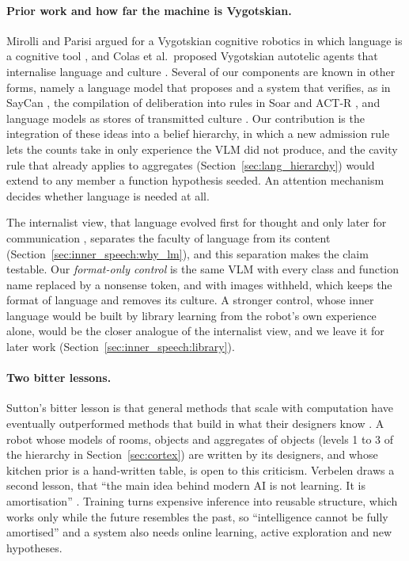 \paragraph{Prior work and how far the machine is Vygotskian.}
Mirolli and Parisi argued for a Vygotskian cognitive robotics in which language is a cognitive tool
\cite{mirolli2011towards}, and Colas et al.\ proposed Vygotskian autotelic agents that internalise language and culture
\cite{colas2022language}. Several of our components are known in other forms, namely a language model that proposes
and a system that verifies, as in SayCan \cite{ahn2022saycan}, the compilation of deliberation into rules in Soar and
ACT-R \cite{laird1986chunking, anderson1982acquisition, taatgen2002production}, and language models as stores of transmitted culture
\cite{yiu2024transmission}. Our contribution is the
integration of these ideas into a belief hierarchy, in which a new admission rule lets the counts take in only
experience the VLM did not produce, and the cavity rule that \cortex{} already applies to aggregates
(Section~\ref{sec:lang_hierarchy}) would extend to any member a function hypothesis seeded. An attention mechanism decides whether language is needed at all.

The internalist view, that
language evolved first for thought and only later for communication \cite{berwick2016why}, separates the faculty of
language from its content (Section~\ref{sec:inner_speech:why_lm}), and this separation makes the claim testable. Our
\emph{format-only control} is the same VLM with every class and function name replaced by a nonsense token, and
with images withheld, which keeps the format of language and removes its culture. A stronger control, whose inner language would be built
by library learning from the robot's own experience alone, would be the closer analogue of the internalist view, and
we leave it for later work (Section~\ref{sec:inner_speech:library}).

\paragraph{Two bitter lessons.}
Sutton's bitter lesson is that general methods that scale with computation have eventually outperformed methods that
build in what their designers know \cite{sutton2019bitter}. A robot whose models of rooms, objects and aggregates of objects (levels 1 to 3 of the hierarchy in
Section~\ref{sec:cortex}) are written by its designers,
and whose kitchen prior is a hand-written table, is open to this criticism. Verbelen draws a second lesson, that ``the
main idea behind modern AI is not learning. It is amortisation'' \cite{verbelen2026newbitter}. Training turns
expensive inference into reusable structure, which works only while the future resembles the past, so ``intelligence
cannot be fully amortised'' and a system also needs online learning, active exploration and new hypotheses.

